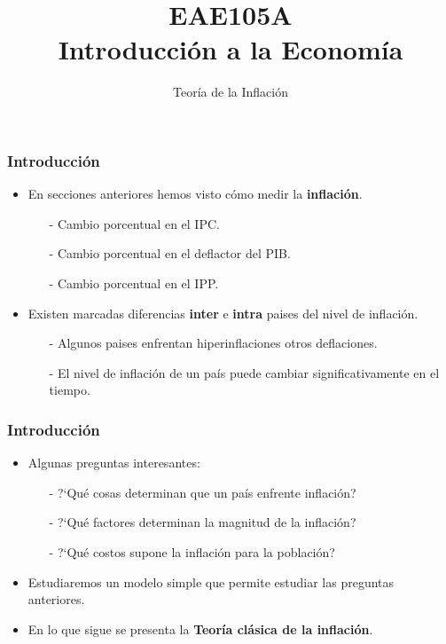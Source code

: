 \documentclass{beamer}
\title[EAE105A]{EAE105A \\ Introducci\'on a la Econom\'ia}
\subtitle[Teor\'ia de la Inflaci\'on]{Teor\'ia de la Inflaci\'on}
\institute[PUC]{Instituto de Econom\'ia\\
Pontificia Universidad Cat\'olica de Chile}
\date[$\:$]
\begin{document}
\maketitle

\begin{frame}
\frametitle{Introducci\'on}
\begin{itemize}
\setlength\itemsep{1.4em}
\item En secciones anteriores hemos visto c\'omo medir la \textbf{inflaci\'on}.\\
\begin{itemize}
\setlength\itemsep{1.0em}
\item[-] Cambio porcentual en el IPC.
\item[-] Cambio porcentual en el deflactor del PIB.
\item[-] Cambio porcentual en el IPP.
\end{itemize}
\item Existen marcadas diferencias \textbf{inter} e \textbf{intra} paises del nivel de inflaci\'on.\\
\begin{itemize}
\setlength\itemsep{1.0em}
\item[-] Algunos paises enfrentan hiperinflaciones otros deflaciones.
\item[-] El nivel de inflaci\'on de un pa\'is puede cambiar significativamente en el tiempo.
\end{itemize}
\end{itemize}
\end{frame}


\begin{frame}
\frametitle{Introducci\'on}
\begin{itemize}
\setlength\itemsep{1.4em}
\item Algunas preguntas interesantes:\\
\begin{itemize}
\setlength\itemsep{1.0em}
\item[-] ?`Qu\'e cosas determinan que un pa\'is enfrente inflaci\'on?
\item[-] ?`Qu\'e factores determinan la magnitud de la inflaci\'on?
\item[-] ?`Qu\'e costos supone la inflaci\'on para la poblaci\'on?
\end{itemize}
\item Estudiaremos un modelo simple que permite estudiar las preguntas anteriores.
\item En lo que sigue se presenta la \textbf{Teor\'ia cl\'asica de la inflaci\'on}.
\end{itemize}
\end{frame}
\end{document}
